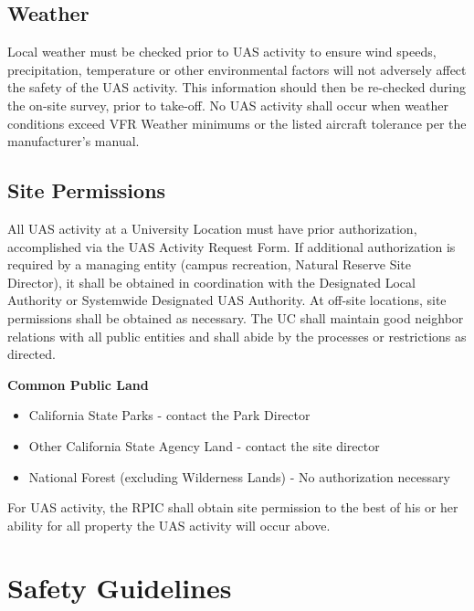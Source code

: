 \documentclass[
]{book}
\providecommand{\tightlist}{%
  \setlength{\itemsep}{0pt}\setlength{\parskip}{0pt}}
\begin{document}
\hypertarget{weather}{%
\subsection{Weather}\label{weather}}

Local weather must be checked prior to UAS activity to ensure wind speeds, precipitation, temperature or other environmental factors will not adversely affect the safety of the UAS activity. This information should then be re-checked during the on-site survey, prior to take-off. No UAS activity shall occur when weather conditions exceed VFR Weather minimums or the listed aircraft tolerance per the manufacturer's manual.

\hypertarget{site-permissions}{%
\subsection{Site Permissions}\label{site-permissions}}

All UAS activity at a University Location must have prior authorization, accomplished via the UAS Activity Request Form. If additional authorization is required by a managing entity (campus recreation, Natural Reserve Site Director), it shall be obtained in coordination with the Designated Local Authority or Systemwide Designated UAS Authority. At off-site locations, site permissions shall be obtained as necessary. The UC shall maintain good neighbor relations with all public entities and shall abide by the processes or restrictions as directed.

\textbf{Common Public Land}

\begin{itemize}
\tightlist
\item
  California State Parks - contact the Park Director
\item
  Other California State Agency Land - contact the site director
\item
  National Forest (excluding Wilderness Lands) - No authorization necessary
\end{itemize}

For UAS activity, the RPIC shall obtain site permission to the best of his or her ability for all property the UAS activity will occur above.

\hypertarget{safety-guidelines}{%
\section{Safety Guidelines}\label{safety-guidelines}}
\end{document}
